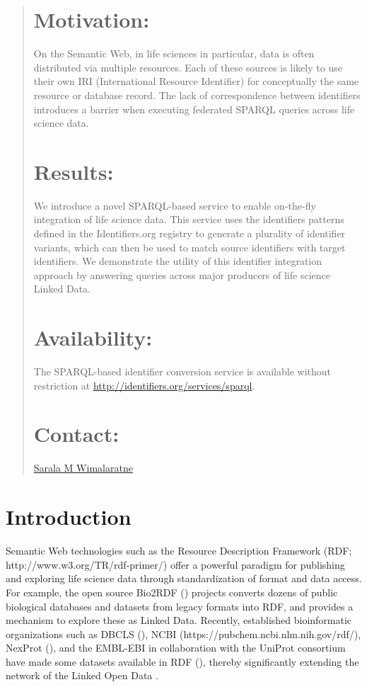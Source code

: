 \documentclass{bioinfo}
\begin{document}
\begin{abstract}
\section{Motivation:}
On the Semantic Web, in life sciences in particular, data is often distributed via multiple resources. Each of these sources is likely to use their own IRI (International Resource Identifier) for conceptually the same resource or database record. The lack of correspondence between identifiers introduces a barrier when executing federated SPARQL queries across life science data.

\section{Results:}
We introduce a novel SPARQL-based service to enable on-the-fly integration of life science data. This service uses the identifiers patterns defined in the Identifiers.org registry to generate a plurality of identifier variants, which can then be used to match source identifiers with target identifiers. We demonstrate the utility of this identifier integration approach by answering queries across major producers of life science Linked Data.

\section{Availability:}
The SPARQL-based identifier conversion service is available without restriction at \linebreak\href{http://identifiers.org/services/sparql}{http://identifiers.org/services/sparql}.

\section{Contact:} \href{sarala@ebi.ac.uk}{Sarala M Wimalaratne}
\end{abstract}

\section{Introduction}
Semantic Web technologies such as the Resource Description Framework (RDF; http://www.w3.org/TR/rdf-primer/) offer a powerful paradigm for publishing and exploring life science data through standardization of format and data access. For example, the open source Bio2RDF (\cite{Biordf2}) projects converts dozens of public biological databases and datasets from legacy formats into RDF, and provides a mechanism to explore these as Linked Data. Recently, established bioinformatic organizations such as DBCLS (\cite{Kawano2014}), NCBI (https://pubchem.ncbi.nlm.nih.gov/rdf/), NexProt (\cite{Chichester2014}), and the EMBL-EBI in collaboration with the UniProt consortium have made some datasets available in RDF (\cite{Jupp01052014}), thereby significantly extending the network of the Linked Open Data .
\end{document}
